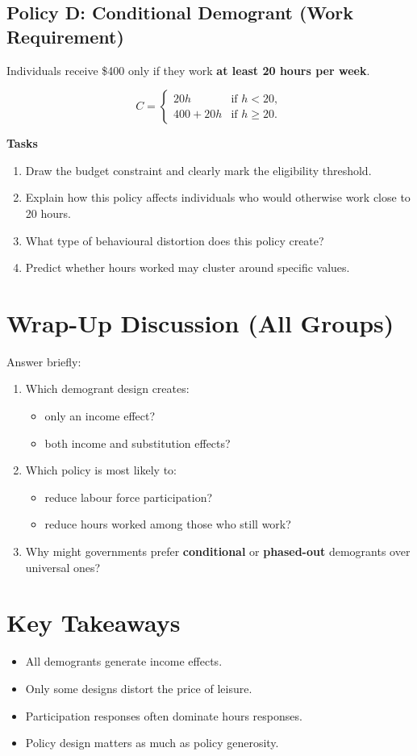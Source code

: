 \documentclass[12pt]{article}
\begin{document}
\subsection*{Policy D: Conditional Demogrant (Work Requirement)}

Individuals receive \$400 only if they work \textbf{at least 20 hours per week}.

\[
C =
\begin{cases}
20h & \text{if } h < 20, \\
400 + 20h & \text{if } h \ge 20.
\end{cases}
\]

\textbf{Tasks}
\begin{enumerate}
\item Draw the budget constraint and clearly mark the eligibility threshold.
\item Explain how this policy affects individuals who would otherwise work close to 20 hours.
\item What type of behavioural distortion does this policy create?
\item Predict whether hours worked may cluster around specific values.
\end{enumerate}
\newpage
\section*{Wrap-Up Discussion (All Groups)}

Answer briefly:

\begin{enumerate}
\item Which demogrant design creates:
\begin{itemize}
    \item only an income effect?
    \item both income and substitution effects?
\end{itemize}
\item Which policy is most likely to:
\begin{itemize}
    \item reduce labour force participation?
    \item reduce hours worked among those who still work?
\end{itemize}
\item Why might governments prefer \textbf{conditional} or \textbf{phased-out} demogrants over universal ones?
\end{enumerate}

\section*{Key Takeaways}

\begin{itemize}
\item All demogrants generate income effects.
\item Only some designs distort the price of leisure.
\item Participation responses often dominate hours responses.
\item Policy design matters as much as policy generosity.
\end{itemize}
\end{document}

